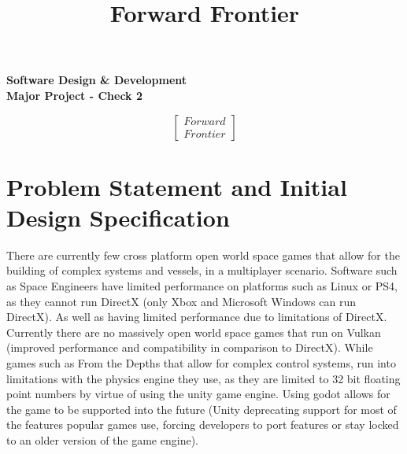 \documentclass[12pt, DIV=calc]{scrartcl}
\title{Forward Frontier}
\author{\authorid}
\newcommand{\authorid}{ID: 35141200}
\begin{document}
\begin{titlepage}
	\color{white}
    \begin{Center}
	    \begin{titlebox}
	    \textbf{\Large{\textsf{Software Design \& Development\\Major Project - Check 2}}} 
	    \end{titlebox}
    \end{Center}
	\vfill
    \begin{Center}
        \Huge{
        \[
        \left[\begin{array}{c}
            Forward\\
            Frontier
        \end{array}\right]
        \]
        }
    \end{Center}
    \vfill
	\noindent
	    \begin{Center}
            {\Huge \textsf{\authorid}}
            \vskip\baselineskip
            \noindent
            \textsf{Compiled \today}
	    \end{Center}
\end{titlepage}
\clearpage




\section{Problem Statement and Initial Design Specification}
There are currently few cross platform open world space games that allow for the building of complex systems and vessels, in a multiplayer scenario. Software such as Space Engineers have limited performance on platforms such as Linux or PS4, as they cannot run DirectX (only Xbox and Microsoft Windows can run DirectX). As well as having limited performance due to limitations of DirectX. Currently there are no massively open world space games that run on Vulkan (improved performance and compatibility in comparison to DirectX). While games such as From the Depths that allow for complex control systems, run into limitations with the physics engine they use, as they are limited to 32 bit floating point numbers by virtue of using the unity game engine. Using godot allows for the game to be supported into the future (Unity deprecating support for most of the features popular games use, forcing developers to port features or stay locked to an older version of the game engine). \\
\end{document}
